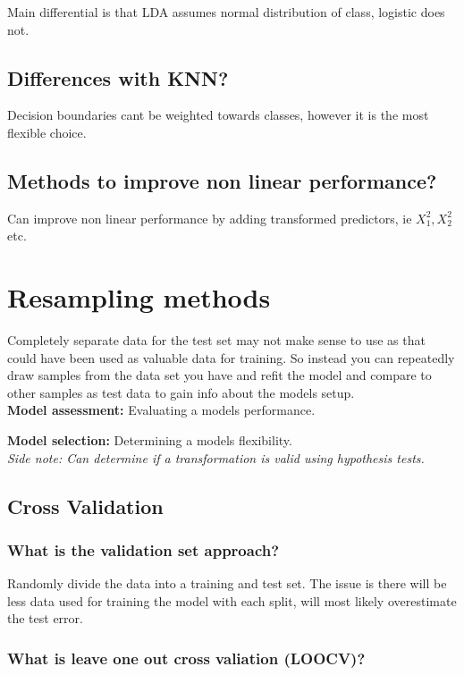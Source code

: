 \documentclass[11pt]{scrartcl} %
\begin{document}
Main differential is that LDA assumes normal distribution of class, logistic does not.

\subsection{Differences with KNN?}

Decision boundaries cant be weighted towards classes, however it is the most flexible choice.

\subsection{Methods to improve non linear performance?}

Can improve non linear performance by adding transformed predictors, ie \(X_1^2,X_2^2\) etc.

\section{Resampling methods}

Completely separate data for the test set may not make sense to use as that could have been used as
valuable data for training. So instead you can repeatedly draw samples
from the data set you have and refit the model and compare to other samples as test data to gain
info about the models setup.\\

\textbf{Model assessment:} Evaluating a models performance.

\textbf{Model selection:} Determining a models flexibility.\\

\textit{Side note: Can determine if a transformation is valid using hypothesis tests.}

\subsection{Cross Validation}

\subsubsection{What is the validation set approach?}

Randomly divide the data into a training and test set. The issue is there will be less data used
for training the model with each split, will most likely overestimate the test error.

\subsubsection{What is leave one out cross valiation (LOOCV)?}
\end{document}
